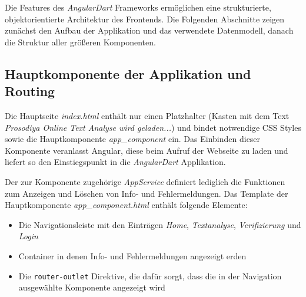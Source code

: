 Die Features des \textit{AngularDart} Frameworks ermöglichen eine strukturierte, objektorientierte Architektur des Frontends. Die Folgenden Abschnitte zeigen zunächst den Aufbau der Applikation und das verwendete Datenmodell, danach die Struktur aller größeren Komponenten.

\subsection{Hauptkomponente der Applikation und Routing}

Die Hauptseite \textit{index.html} enthält nur einen Platzhalter (Kasten mit dem Text \textit{Prosodiya Online Text Analyse wird geladen...}) und bindet notwendige CSS Styles sowie die Hauptkomponente \textit{app\_component} ein. Das Einbinden dieser Komponente veranlasst Angular, diese beim Aufruf der Webseite zu laden und liefert so den Einstiegspunkt in die \textit{AngularDart} Applikation.

Der zur Komponente zugehörige \textit{AppService} definiert lediglich die Funktionen zum Anzeigen und Löschen von Info- und Fehlermeldungen. Das Template der Hauptkomponente \textit{app\_component.html} enthält folgende Elemente:
\begin{itemize}
	\item Die Navigationsleiste mit den Einträgen \textit{Home}, \textit{Textanalyse}, \textit{Verifizierung} und \textit{Login}
	
	\item Container in denen Info- und Fehlermeldungen angezeigt erden
	\item Die \texttt{router-outlet} Direktive, die dafür sorgt, dass die in der Navigation ausgewählte Komponente angezeigt wird
\end{itemize}

